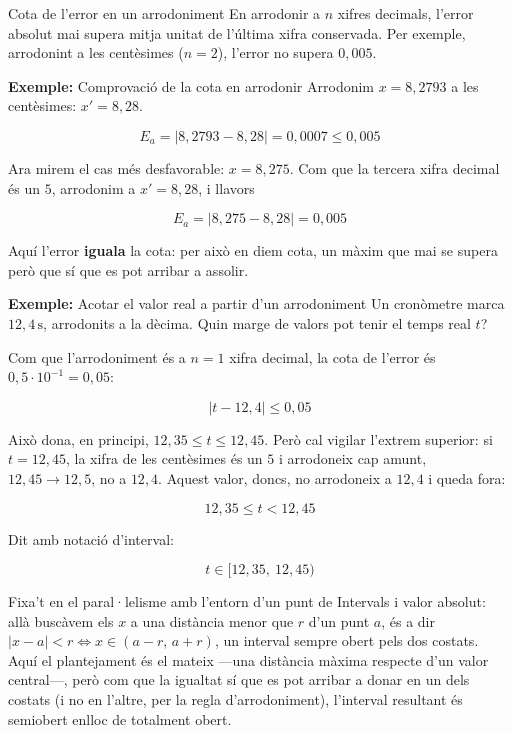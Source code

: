 \begin{nota}{Cota de l'error en un arrodoniment}
En arrodonir a $n$ xifres decimals, l'error absolut mai supera mitja unitat de l'última xifra conservada. Per exemple, arrodonint a les centèsimes ($n=2$), l'error no supera $0{,}005$.
\end{nota}

\begin{exemple}{\textbf{Exemple:} Comprovació de la cota en arrodonir}
Arrodonim $x = 8{,}2793$ a les centèsimes: $x' = 8{,}28$.

\[
E_a = |8{,}2793 - 8{,}28| = 0{,}0007 \leq 0{,}005
\]

Ara mirem el cas més desfavorable: $x = 8{,}275$. Com que la tercera xifra decimal és un $5$, arrodonim a $x' = 8{,}28$, i llavors

\[
E_a = |8{,}275 - 8{,}28| = 0{,}005
\]

Aquí l'error \textbf{iguala} la cota: per això en diem cota, un màxim que mai se supera però que sí que es pot arribar a assolir.
\end{exemple}

\begin{exemple}{\textbf{Exemple:} Acotar el valor real a partir d'un arrodoniment}
Un cronòmetre marca $12{,}4\,\text{s}$, arrodonits a la dècima. Quin marge de valors pot tenir el temps real $t$?

Com que l'arrodoniment és a $n=1$ xifra decimal, la cota de l'error és $0{,}5 \cdot 10^{-1} = 0{,}05$:

\[
|t - 12{,}4| \leq 0{,}05
\]

Això dona, en principi, $12{,}35 \leq t \leq 12{,}45$. Però cal vigilar l'extrem superior: si $t=12{,}45$, la xifra de les centèsimes és un $5$ i arrodoneix cap amunt, $12{,}45 \to 12{,}5$, no a $12{,}4$. Aquest valor, doncs, no arrodoneix a $12{,}4$ i queda fora:

\[
12{,}35 \leq t < 12{,}45
\]

Dit amb notació d'interval:

\[
t \in [12{,}35,\ 12{,}45)
\]

Fixa't en el paral·lelisme amb l'entorn d'un punt de Intervals i valor absolut: allà buscàvem els $x$ a una distància menor que $r$ d'un punt $a$, és a dir $|x-a|<r \Leftrightarrow x \in (a-r,\,a+r)$, un interval sempre obert pels dos costats. Aquí el plantejament és el mateix —una distància màxima respecte d'un valor central—, però com que la igualtat sí que es pot arribar a donar en un dels costats (i no en l'altre, per la regla d'arrodoniment), l'interval resultant és semiobert enlloc de totalment obert.
\end{exemple}

